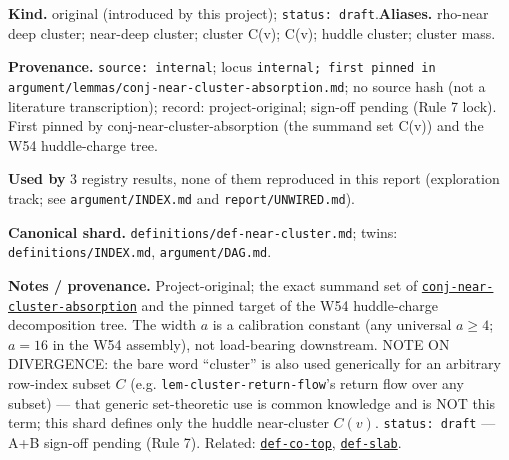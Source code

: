 \begin{defnote}
\textbf{Kind.} original (introduced by this project); \texttt{status: draft}.\quad\textbf{Aliases.} rho-near deep cluster; near-deep cluster; cluster C(v); C(v); huddle cluster; cluster mass.
\par
\textbf{Provenance.} \texttt{source: internal}; locus \texttt{internal;\allowbreak{} first pinned in argument/\allowbreak{}lemmas/\allowbreak{}conj-\allowbreak{}near-\allowbreak{}cluster-\allowbreak{}absorption.\allowbreak{}md}; no source hash (not a literature transcription); record: project-\allowbreak{}original;\allowbreak{} sign-\allowbreak{}off pending (Rule 7 lock).\allowbreak{} First pinned by conj-\allowbreak{}near-\allowbreak{}cluster-\allowbreak{}absorption (the summand set C(v)) and the W54 huddle-\allowbreak{}charge tree.
\par
\textbf{Used by} 3 registry results, none of them reproduced in this report (exploration track; see \texttt{argument/INDEX.md} and \texttt{report/UNWIRED.md}).
\par
\textbf{Canonical shard.} \texttt{definitions/\allowbreak{}def-\allowbreak{}near-\allowbreak{}cluster.\allowbreak{}md}; twins: \texttt{definitions/INDEX.md}, \texttt{argument/DAG.md}.
\par
\textbf{Notes / provenance.} Project-original; the exact summand set of
\hyperlink{dag:conj-near-cluster-absorption}{\texttt{conj-\allowbreak{}near-\allowbreak{}cluster-\allowbreak{}absorption}} and the pinned target of the W54 huddle-charge decomposition tree.
The width $a$ is a calibration constant (any universal $a\ge4$; $a=16$ in the W54 assembly), not
load-bearing downstream. NOTE ON DIVERGENCE: the bare word ``cluster'' is also used generically for an
arbitrary row-index subset $C$ (e.g. \texttt{lem-\allowbreak{}cluster-\allowbreak{}return-\allowbreak{}flow}'s return flow over any subset) --- that
generic set-theoretic use is common knowledge and is NOT this term; this shard defines only the
huddle near-cluster $C(v)$. \texttt{status:\allowbreak{} draft} --- A+B sign-off pending (Rule 7). Related: \hyperref[def:co-top]{\texttt{def-\allowbreak{}co-\allowbreak{}top}},
\hyperref[def:slab]{\texttt{def-\allowbreak{}slab}}.
\end{defnote}

